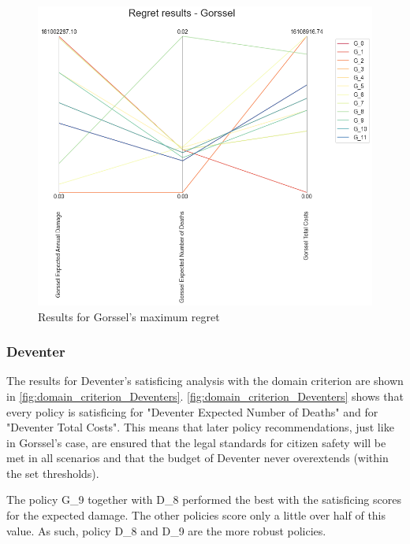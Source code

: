 \begin{figure}[H]
\begin{minipage}[b]{0.4\textwidth}
    \includegraphics[width=1.15\textwidth]{report/figures/results/regret_figure_Gorssel.png}
    \caption{Results for Gorssel's maximum regret}
    \label{fig:regret_gorssel}
  \end{minipage}
\end{figure}




\subsubsection{Deventer}
The results for Deventer's satisficing analysis with the domain criterion are shown in  \autoref{fig:domain_criterion_Deventers}. 
\autoref{fig:domain_criterion_Deventers} shows that every policy is satisficing for "Deventer Expected Number of Deaths" and for "Deventer Total Costs". This means that later policy recommendations, just like in Gorssel's case, are ensured that the legal standards for citizen safety will be met in all scenarios and that the budget of Deventer never overextends (within the set thresholds). 

The policy G\_9 together with D\_8 performed the best with the satisficing scores for the expected damage. The other policies score only a little over half of this value. As such, policy D\_8 and D\_9 are the more robust policies. \newline 

